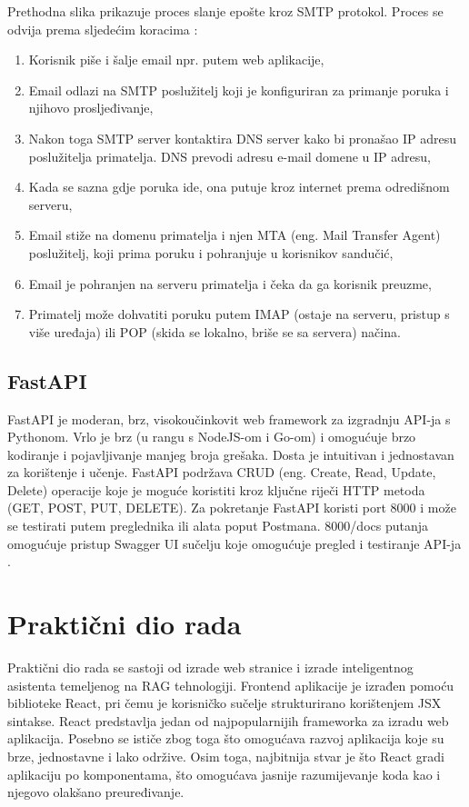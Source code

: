 \documentclass[]{foi}
\begin{document}
Prethodna slika prikazuje proces slanje epošte kroz SMTP protokol. Proces se odvija prema sljedećim koracima \cite{gillisSMTP}:
\begin{enumerate}
    \item Korisnik piše i šalje email npr. putem web aplikacije,
    \item Email odlazi na SMTP poslužitelj koji je konfiguriran za primanje poruka i njihovo prosljeđivanje,
    \item Nakon toga SMTP server kontaktira DNS server kako bi pronašao IP adresu poslužitelja primatelja. DNS prevodi adresu e-mail domene u IP adresu,
    \item Kada se sazna gdje poruka ide, ona putuje kroz internet prema odredišnom serveru,
    \item Email stiže na domenu primatelja i njen MTA (eng. Mail Transfer Agent) poslužitelj, koji prima poruku i pohranjuje u korisnikov sandučić,
    \item Email je pohranjen na serveru primatelja i čeka da ga korisnik preuzme,
    \item Primatelj može dohvatiti poruku putem IMAP (ostaje na serveru, pristup s više uređaja) ili POP (skida se lokalno, briše se sa servera) načina.
\end{enumerate}
\newpage
\section{FastAPI}
FastAPI je moderan, brz, visokoučinkovit web framework za izgradnju API-ja s Pythonom. Vrlo je brz (u rangu s NodeJS-om i Go-om) i
omogućuje brzo kodiranje i pojavljivanje manjeg broja grešaka. Dosta je intuitivan i jednostavan za korištenje i učenje. FastAPI podržava CRUD
(eng. Create, Read, Update, Delete) operacije koje je moguće koristiti kroz ključne riječi HTTP metoda (GET, POST, PUT, DELETE). Za pokretanje
FastAPI koristi port 8000 i može se testirati putem preglednika ili alata poput Postmana. 8000/docs putanja omogućuje pristup
Swagger UI sučelju koje omogućuje pregled i testiranje API-ja \cite{obafemi2025fastapi}. 


\chapter{Praktični dio rada}
Praktični dio rada se sastoji od izrade web stranice i izrade inteligentnog asistenta temeljenog na RAG tehnologiji. Frontend aplikacije
je izrađen pomoću biblioteke React, pri čemu je korisničko sučelje strukturirano korištenjem JSX sintakse. React predstavlja jedan od najpopularnijih frameworka za izradu web aplikacija. Posebno se ističe zbog toga što omogućava
razvoj aplikacija koje su brze, jednostavne i lako održive. Osim toga, najbitnija stvar je što React gradi aplikaciju po komponentama, što omogućava
jasnije razumijevanje koda kao i njegovo olakšano preuređivanje.
\end{document}
